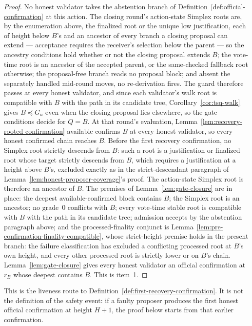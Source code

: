\begin{proof}
No honest validator takes the abstention branch of
Definition~\ref{def:official-confirmation} at this action.  The closing
round's action-state Simplex roots are, by the enumeration above, the
finalized root or the unique low justification, each of height below
\(B\)'s and an ancestor of every branch a closing proposal can extend
--- acceptance requires the receiver's selection below the parent ---
so the ancestry conditions hold whether or not the closing proposal
extends \(B\); the vote-time root is an ancestor of the accepted
parent, or the same-checked fallback root otherwise; the proposal-free
branch reads no proposal block; and absent the
separately handled mid-round moves, no re-derivation fires.  The guard
therefore passes at every honest validator, and since each validator's
walk root is compatible with \(B\) with the path in its candidate
tree, Corollary~\ref{cor:tsq-walk} gives \(B\preceq G_u\) even when
the closing proposal lies elsewhere, so the gate conditions decide for
\(Q=B\).  At that round's evaluation,
Lemma~\ref{lem:recovery-rooted-confirmation} available-confirms \(B\) at
every honest validator, so every honest confirmed chain reaches \(B\).
Before the first recovery confirmation, no Simplex root strictly descends
from \(B\): such a root is a justification or finalized root whose
target strictly descends from \(B\), which requires a justification at a
height above \(B\)'s, excluded exactly as in the strict-descendant
paragraph of Lemma~\ref{lem:honest-proposer-coverage}'s proof.  The
action-state Simplex root is therefore an ancestor of \(B\).  The
premises of Lemma~\ref{lem:gate-closure} are in place: the deepest
available-confirmed block contains \(B\); the Simplex root is an
ancestor; no grade~0 conflicts with \(B\); every vote-time stable root
is compatible with \(B\) with the path in its candidate tree;
admission accepts by the abstention paragraph above; and the
processed-finality conjunct is
Lemma~\ref{lem:pre-confirmation-finality-compatible}, whose
strict-height premise holds in the present branch: the failure
classification has excluded a conflicting processed root at \(B\)'s
own height, and every other processed root is strictly lower or on
\(B\)'s chain.
Lemma~\ref{lem:gate-closure} gives every honest validator an official
confirmation at \(r_B\) whose deepest contains \(B\).  This is
item~1.
\end{proof}

This is the liveness route to
Definition~\ref{def:first-recovery-confirmation}.  It is not the definition
of the safety event: if a faulty proposer produces the first honest official
confirmation at height \(H+1\), the proof below starts from that earlier
confirmation.

